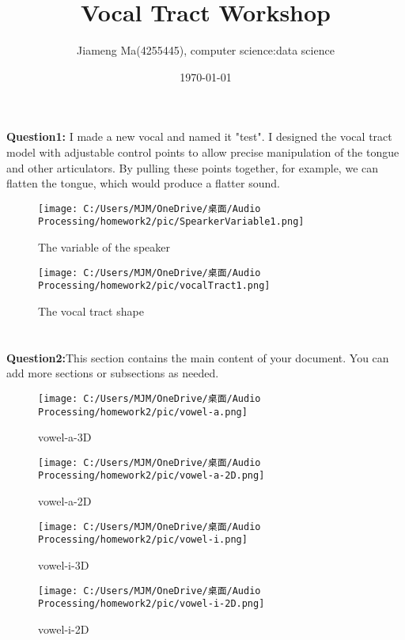 \documentclass[10pt]{article}
\title{Vocal Tract Workshop}
\author{Jiameng Ma(4255445), computer science:data science}
\date{\today}  %
\begin{document}
	
	\maketitle
	
	\section*{}
	\textbf{Question1:} I made a new vocal and named it "test". I designed the vocal tract model with adjustable control points to allow precise manipulation of the tongue and other articulators. By pulling these points together, for example, we can flatten the tongue, which would produce a flatter sound. 
	
	\begin{figure}[h!]
		\centering
		\texttt{[image: C:/Users/MJM/OneDrive/桌面/Audio Processing/homework2/pic/SpearkerVariable1.png]}
		\caption{The variable of the speaker}
		\label{fig:speaker-variable}
	\end{figure}
	
	\begin{figure}[h!]
		\centering
		\texttt{[image: C:/Users/MJM/OneDrive/桌面/Audio Processing/homework2/pic/vocalTract1.png]}
		\caption{The vocal tract shape}
		\label{fig:vocal-tract}
	\end{figure}

	\section*{}
	\textbf{Question2:}This section contains the main content of your document. You can add more sections or subsections as needed.
	\begin{figure}[htbp]
		\begin{minipage}[t]{0.45\linewidth}
			\centering
			\texttt{[image: C:/Users/MJM/OneDrive/桌面/Audio Processing/homework2/pic/vowel-a.png]}
			\caption{vowel-a-3D}
		\end{minipage}%
		\begin{minipage}[t]{0.45\linewidth}
			\centering
			\texttt{[image: C:/Users/MJM/OneDrive/桌面/Audio Processing/homework2/pic/vowel-a-2D.png]}
			\caption{vowel-a-2D}
		\end{minipage}
	\end{figure}

	\begin{figure}[htbp]
		\begin{minipage}[t]{0.45\linewidth}
			\centering
			\texttt{[image: C:/Users/MJM/OneDrive/桌面/Audio Processing/homework2/pic/vowel-i.png]}
			\caption{vowel-i-3D}
		\end{minipage}%
		\begin{minipage}[t]{0.45\linewidth}
			\centering
			\texttt{[image: C:/Users/MJM/OneDrive/桌面/Audio Processing/homework2/pic/vowel-i-2D.png]}
			\caption{vowel-i-2D}
		\end{minipage}
	\end{figure}
	
\end{document}
